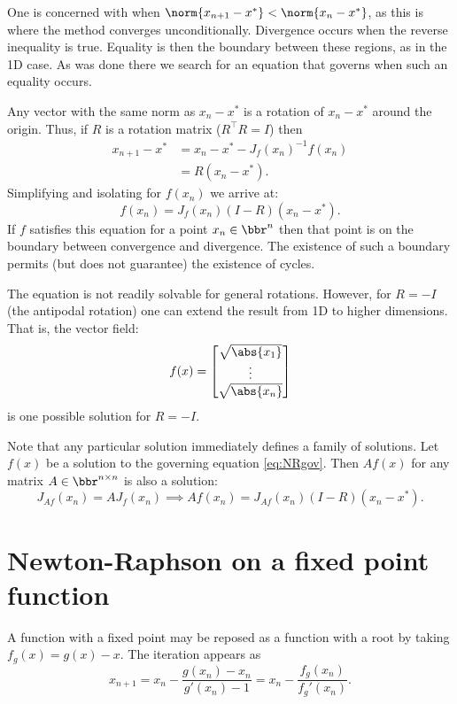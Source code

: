 \documentclass{article}
\begin{document}
One is concerned with when $\norm{x_{n+1} - x^*} < \norm{x_n - x^*}$, as this is where the method converges unconditionally.
Divergence occurs when the reverse inequality is true.
Equality is then the boundary between these regions, as in the 1D case.
As was done there we search for an equation that governs when such an equality occurs.

Any vector with the same norm as $x_n - x^*$ is a rotation of $x_n - x^*$ around the origin.
Thus, if $R$ is a rotation matrix ($R^\top R = I$) then
\begin{align*}
	x_{n+1} - x^* & = x_n - x^* - J_f(x_n)^{-1} f(x_n) \\
				  & = R ( x_n - x^* ).
\end{align*}
Simplifying and isolating for $f(x_n)$ we arrive at:
\begin{equation} \label{eq:NRgov}
f(x_n) = J_f(x_n) (I - R) (x_n - x^*).
\end{equation}
If $f$ satisfies this equation for a point $x_n \in \bbr^n$ then that point is on the boundary between convergence and divergence.
The existence of such a boundary permits (but does not guarantee) the existence of cycles.

The equation is not readily solvable for general rotations.
However, for $R = -I$ (the antipodal rotation) one can extend the result from 1D to higher dimensions.
That is, the vector field:
\begin{equation*}
	f(x) = \begin{bmatrix}
	\sqrt{\abs{x_1}} \\ \vdots \\ \sqrt{\abs{x_n}}
	\end{bmatrix}
\end{equation*}
is one possible solution for $R = -I$.

Note that any particular solution immediately defines a family of solutions.
Let $f(x)$ be a solution to the governing equation \ref{eq:NRgov}.
Then $A f(x)$ for any matrix $A \in \bbr^{n \times n}$ is also a solution:
\begin{equation*}
	J_{Af}(x_n) = A J_f(x_n) \implies Af(x_n) = J_{Af}(x_n) (I-R) (x_n - x^*).
\end{equation*}

\section{Newton-Raphson on a fixed point function}
\label{sec:nrfp}

A function with a fixed point may be reposed as a function with a root by taking $f_g(x) = g(x) - x$.
The iteration appears as
\begin{equation*}
x_{n+1} = x_n - \frac{g(x_n) - x_n}{g'(x_n) - 1} = x_n - \frac{f_g(x_n)}{f_g'(x_n)} .
\end{equation*}
\end{document}
